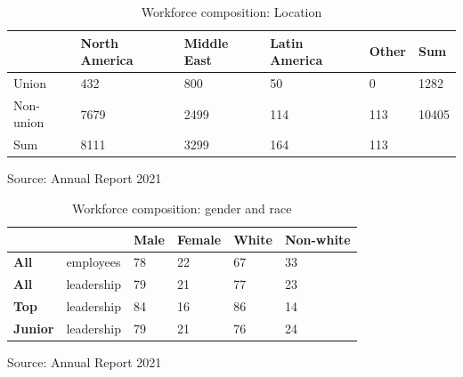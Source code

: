 \documentclass[
	a4paper, %
	12pt,%
]{CSSullivanBusinessReport}
\begin{document}
\begin{fullwidth}
\begin{appendices}
\begin{table}[!ht]\footnotesize
    \centering
\caption{Workforce composition: Location}
    \begin{tabular}{llllll}
    \hline
        ~ & North America & Middle East & Latin America & Other & Sum  \\ \hline
        Union & 432 & 800 & 50 & 0 & 1282  \\ 
        Non-union & 7679 & 2499 & 114 & 113 & 10405  \\ 
        Sum & 8111 & 3299 & 164 & 113 &   \\ \hline
    \end{tabular}
    Source: Annual Report 2021\cite{AnnualRepo2021}
    \label{wc1}
\end{table}
\begin{table}[!ht]\footnotesize
    \centering
    \caption{Workforce composition: gender and race}
    \begin{tabular}{llllll}
    \hline
        \textbf{} & \textbf{} & \textbf{Male} & \textbf{Female} & \textbf{White} & \textbf{Non-white } \\ \hline
        \textbf{All} & employees & 78 & 22 & 67 & 33  \\ 
        \textbf{All} & leadership & 79 & 21 & 77 & 23  \\ 
        \textbf{Top} & leadership & 84 & 16 & 86 & 14  \\ 
        \textbf{Junior} & leadership & 79 & 21 & 76 & 24  \\ \hline
    \end{tabular}
    \label{wc2}
    Source: Annual Report 2021 \cite{AnnualRepo2021}
\end{table}



\end{appendices}
\end{fullwidth}
\end{document}

